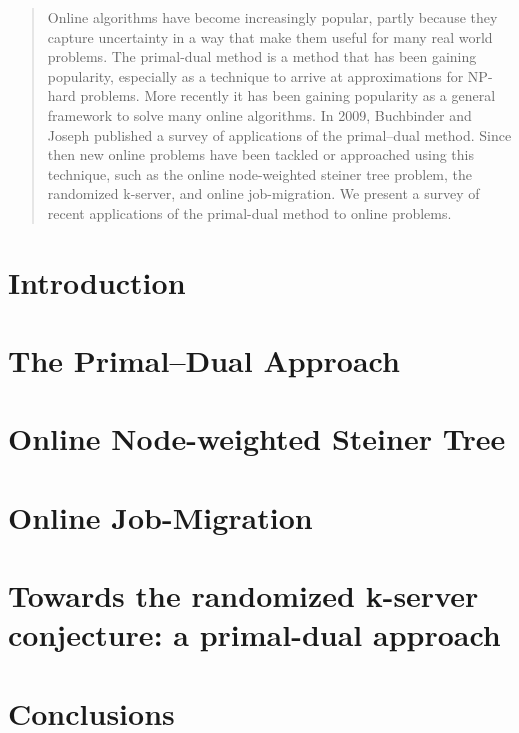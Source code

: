 \documentclass[10pt, twocolumn]{article}
\begin{document}
\maketitle

\begin{abstract}
Online algorithms have become increasingly popular, partly because they capture uncertainty in a way that make them useful for many real world problems. The primal-dual method is a method that has been gaining popularity, especially as a technique to arrive at approximations for NP-hard problems.  More recently it has been gaining popularity as a general framework to solve many online algorithms. In 2009, Buchbinder and Joseph published a survey of applications of the primal--dual method. Since then new online problems have been tackled or approached using this technique, such as the online node-weighted steiner tree problem, the randomized k-server, and online job-migration. We present a survey of recent applications of the primal-dual method to online problems.
\end{abstract}

\section{Introduction}





\section{The Primal--Dual Approach}


\section{Online Node-weighted Steiner Tree}


\section{Online Job-Migration}


\section{Towards the randomized k-server conjecture: a primal-dual approach}


\section{Conclusions}



\end{document}
